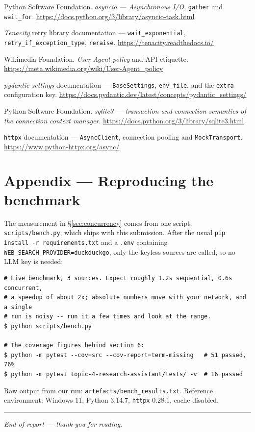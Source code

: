 \documentclass[11pt,a4paper]{article}
\begin{document}
\begin{enumerate}[label={[\arabic*]},leftmargin=2.4em,itemsep=2pt]
  \item Python Software Foundation. \textit{asyncio --- Asynchronous I/O}, \texttt{gather} and
  \texttt{wait\_for}. \url{https://docs.python.org/3/library/asyncio-task.html}
  \item \textit{Tenacity} retry library documentation --- \texttt{wait\_exponential},
  \texttt{retry\_if\_exception\_type}, \texttt{reraise}.
  \url{https://tenacity.readthedocs.io/}
  \item Wikimedia Foundation. \textit{User-Agent policy} and API etiquette.
  \url{https://meta.wikimedia.org/wiki/User-Agent_policy}
  \item \textit{pydantic-settings} documentation --- \texttt{BaseSettings}, \texttt{env\_file},
  and the \texttt{extra} configuration key. \url{https://docs.pydantic.dev/latest/concepts/pydantic_settings/}
  \item Python Software Foundation. \textit{sqlite3 --- transaction and connection semantics of
  the connection context manager}. \url{https://docs.python.org/3/library/sqlite3.html}
  \item \texttt{httpx} documentation --- \texttt{AsyncClient}, connection pooling and
  \texttt{MockTransport}. \url{https://www.python-httpx.org/async/}
\end{enumerate}

\appendix
\section{Appendix --- Reproducing the benchmark}\label{app:bench}

The measurement in \S\ref{sec:concurrency} comes from one script,
\texttt{scripts/bench.py}, which ships with this submission. After the usual
\texttt{pip install -r requirements.txt} and a \texttt{.env} containing
\texttt{WEB\_SEARCH\_PROVIDER=duckduckgo}, only the keyless sources are called, so no LLM key is
needed:

\begin{lstlisting}[style=plain]
# Live benchmark, 3 sources. Expect roughly 1.2s sequential, 0.6s concurrent,
# a speedup of about 2x; absolute numbers move with your network, and a single
# run is noisy -- run it a few times and look at the range.
$ python scripts/bench.py

# The coverage figures behind section 6:
$ python -m pytest --cov=src --cov-report=term-missing   # 51 passed, 76%
$ python -m pytest topic-4-research-assistant/tests/ -v  # 16 passed
\end{lstlisting}

Raw output from our run: \texttt{artefacts/bench\_results.txt}. Reference environment: Windows 11,
Python 3.14.7, \texttt{httpx} 0.28.1, cache disabled.

\vspace{1em}\hrule\vspace{0.6em}
\noindent\small\textit{End of report --- thank you for reading.}
\end{document}
